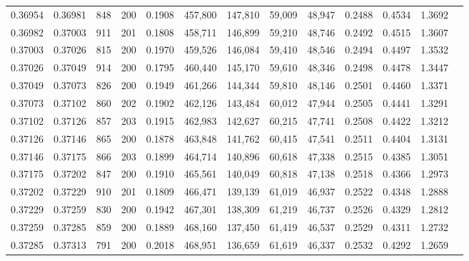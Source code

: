 \begin{tabular}{rrrrrrrrrrrrr}
0.36954 & 0.36981 &   848 & 200 &                                     0.1908 & 457,800 & 147,810 &  59,009 &  48,947 & 0.2488 & 0.4534 & 1.3692 \\
0.36982 & 0.37003 &   911 & 201 &                                     0.1808 & 458,711 & 146,899 &  59,210 &  48,746 & 0.2492 & 0.4515 & 1.3607 \\
0.37003 & 0.37026 &   815 & 200 &                                     0.1970 & 459,526 & 146,084 &  59,410 &  48,546 & 0.2494 & 0.4497 & 1.3532 \\
0.37026 & 0.37049 &   914 & 200 &                                     0.1795 & 460,440 & 145,170 &  59,610 &  48,346 & 0.2498 & 0.4478 & 1.3447 \\
0.37049 & 0.37073 &   826 & 200 &                                     0.1949 & 461,266 & 144,344 &  59,810 &  48,146 & 0.2501 & 0.4460 & 1.3371 \\
0.37073 & 0.37102 &   860 & 202 &                                     0.1902 & 462,126 & 143,484 &  60,012 &  47,944 & 0.2505 & 0.4441 & 1.3291 \\
0.37102 & 0.37126 &   857 & 203 &                                     0.1915 & 462,983 & 142,627 &  60,215 &  47,741 & 0.2508 & 0.4422 & 1.3212 \\
0.37126 & 0.37146 &   865 & 200 &                                     0.1878 & 463,848 & 141,762 &  60,415 &  47,541 & 0.2511 & 0.4404 & 1.3131 \\
0.37146 & 0.37175 &   866 & 203 &                                     0.1899 & 464,714 & 140,896 &  60,618 &  47,338 & 0.2515 & 0.4385 & 1.3051 \\
0.37175 & 0.37202 &   847 & 200 &                                     0.1910 & 465,561 & 140,049 &  60,818 &  47,138 & 0.2518 & 0.4366 & 1.2973 \\
0.37202 & 0.37229 &   910 & 201 &                                     0.1809 & 466,471 & 139,139 &  61,019 &  46,937 & 0.2522 & 0.4348 & 1.2888 \\
0.37229 & 0.37259 &   830 & 200 &                                     0.1942 & 467,301 & 138,309 &  61,219 &  46,737 & 0.2526 & 0.4329 & 1.2812 \\
0.37259 & 0.37285 &   859 & 200 &                                     0.1889 & 468,160 & 137,450 &  61,419 &  46,537 & 0.2529 & 0.4311 & 1.2732 \\
0.37285 & 0.37313 &   791 & 200 &                                     0.2018 & 468,951 & 136,659 &  61,619 &  46,337 & 0.2532 & 0.4292 & 1.2659 \\

\end{tabular}
